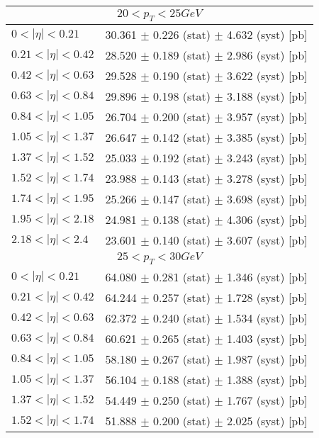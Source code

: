 \begin{tabular}{lc}
\hline
\hline
\multicolumn{2}{c}{$20 < p_{T} < 25 GeV$} \\
\hline
$0 < |\eta| <0.21$             & 30.361 $\pm$ 0.226 (stat) $\pm$ 4.632 (syst) [pb]  \\
$0.21 < |\eta| <0.42$          & 28.520 $\pm$ 0.189 (stat) $\pm$ 2.986 (syst) [pb]  \\
$0.42 < |\eta| <0.63$          & 29.528 $\pm$ 0.190 (stat) $\pm$ 3.622 (syst) [pb]  \\
$0.63 < |\eta| <0.84$          & 29.896 $\pm$ 0.198 (stat) $\pm$ 3.188 (syst) [pb]  \\
$0.84 < |\eta| <1.05$          & 26.704 $\pm$ 0.200 (stat) $\pm$ 3.957 (syst) [pb]  \\
$1.05 < |\eta| <1.37$          & 26.647 $\pm$ 0.142 (stat) $\pm$ 3.385 (syst) [pb]  \\
$1.37 < |\eta| <1.52$          & 25.033 $\pm$ 0.192 (stat) $\pm$ 3.243 (syst) [pb]  \\
$1.52 < |\eta| <1.74$          & 23.988 $\pm$ 0.143 (stat) $\pm$ 3.278 (syst) [pb]  \\
$1.74 < |\eta| <1.95$          & 25.266 $\pm$ 0.147 (stat) $\pm$ 3.698 (syst) [pb]  \\
$1.95 < |\eta| <2.18$          & 24.981 $\pm$ 0.138 (stat) $\pm$ 4.306 (syst) [pb]  \\
$2.18 < |\eta| <2.4$           & 23.601 $\pm$ 0.140 (stat) $\pm$ 3.607 (syst) [pb]  \\
\hline
\multicolumn{2}{c}{$25 < p_{T} < 30 GeV$} \\
\hline
$0 < |\eta| <0.21$             & 64.080 $\pm$ 0.281 (stat) $\pm$ 1.346 (syst) [pb]  \\
$0.21 < |\eta| <0.42$          & 64.244 $\pm$ 0.257 (stat) $\pm$ 1.728 (syst) [pb]  \\
$0.42 < |\eta| <0.63$          & 62.372 $\pm$ 0.240 (stat) $\pm$ 1.534 (syst) [pb]  \\
$0.63 < |\eta| <0.84$          & 60.621 $\pm$ 0.265 (stat) $\pm$ 1.403 (syst) [pb]  \\
$0.84 < |\eta| <1.05$          & 58.180 $\pm$ 0.267 (stat) $\pm$ 1.987 (syst) [pb]  \\
$1.05 < |\eta| <1.37$          & 56.104 $\pm$ 0.188 (stat) $\pm$ 1.388 (syst) [pb]  \\
$1.37 < |\eta| <1.52$          & 54.449 $\pm$ 0.250 (stat) $\pm$ 1.767 (syst) [pb]  \\
$1.52 < |\eta| <1.74$          & 51.888 $\pm$ 0.200 (stat) $\pm$ 2.025 (syst) [pb]  \\

\end{tabular}
